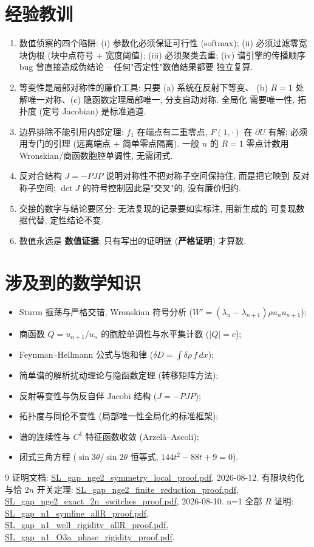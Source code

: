 \documentclass[UTF8]{ctexart}
\newcommand{\STRICT}{\textbf{严格证明}}
\newcommand{\EVIDENCE}{\textbf{数值证据}}
\begin{document}
\section{经验教训}

\begin{enumerate}
	\item 数值侦察的四个陷阱: (i) 参数化必须保证可行性 (softmax);
	(ii) 必须过滤零宽块伪根 (块中点符号 + 宽度阈值); (iii) 必须聚类去重;
	(iv) 谱引擎的传播顺序 bug 曾直接造成伪结论 -- 任何"否定性"数值结果都要
	独立复算.
	\item 等变性是局部对称性的廉价工具: 只要 (a) 系统在反射下等变、
	(b) $R=1$ 处解唯一对称、(c) 隐函数定理局部唯一, 分支自动对称. 全局化
	需要唯一性, 拓扑度 (定号 Jacobian) 是标准通道.
	\item 边界排除不能引用内部定理: $f_1$ 在端点有二重零点, $F(1,\cdot)$
	在 $\partial U$ 有解; 必须用专门的引理 (远离端点 + 简单零点隔离).
	一般 $n$ 的 $R=1$ 零点计数用 Wronskian/商函数胞腔单调性, 无需闭式.
	\item 反对合结构 $J=-PJP$ 说明对称性不把对称子空间保持住, 而是把它映到
	反对称子空间; $\det J$ 的符号控制因此是"交叉"的, 没有廉价归约.
	\item 交接的数字与结论要区分: 无法复现的记录要如实标注, 用新生成的
	可复现数据代替, 定性结论不变.
	\item 数值永远是 \EVIDENCE; 只有写出的证明链 (\STRICT) 才算数.
\end{enumerate}

\section{涉及到的数学知识}

\begin{itemize}
	\item Sturm 振荡与严格交错, Wronskian 符号分析 ($W'=(\lambda_n-\lambda_{n+1})\rho u_nu_{n+1}$);
	\item 商函数 $Q=u_{n+1}/u_n$ 的胞腔单调性与水平集计数 ($|Q|=c$);
	\item Feynman--Hellmann 公式与饱和律 ($\delta D=\int\delta\rho\,f\,dx$);
	\item 简单谱的解析扰动理论与隐函数定理 (转移矩阵方法);
	\item 反射等变性与伪反自伴 Jacobi 结构 ($J=-PJP$);
	\item 拓扑度与同伦不变性 (局部唯一性全局化的标准框架);
	\item 谱的连续性与 $C^1$ 特征函数收敛 (Arzel\`a--Ascoli);
	\item 闭式三角方程 ($\sin3\theta/\sin2\theta$ 恒等式, $144t^2-88t+9=0$).
\end{itemize}

\begin{thebibliography}{9}
 证明文档: \url{SL_gap_nge2_symmetry_local_proof.pdf}, 2026-08-12.
 有限块约化与恰 $2n$ 开关定理:
\url{SL_gap_nge2_finite_reduction_proof.pdf}, \url{SL_gap_nge2_exact_2n_switches_proof.pdf}, 2026-08-10.
 n=1 全部 $R$ 证明: \url{SL_gap_n1_symline_allR_proof.pdf},
\url{SL_gap_n1_well_rigidity_allR_proof.pdf}, \url{SL_gap_n1_O3a_phase_rigidity_proof.pdf}.
\end{thebibliography}
\end{document}
